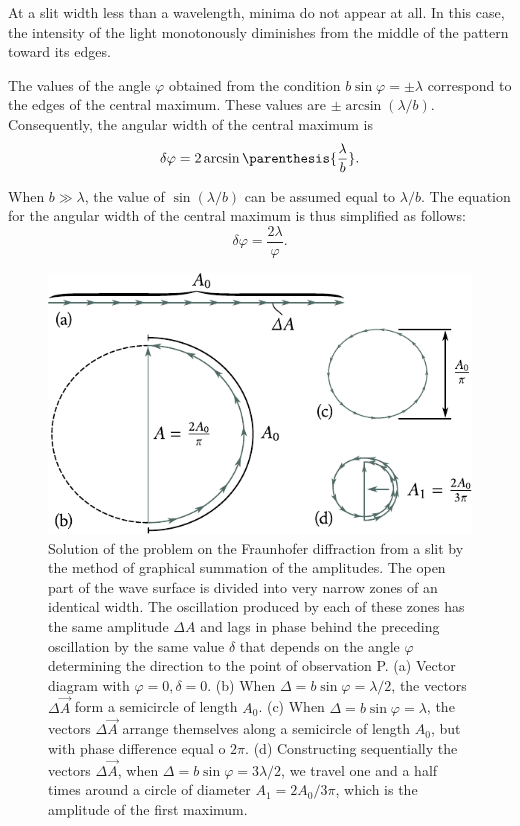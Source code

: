 \noindent
At a slit width less than a wavelength, minima do not appear at all.
In this case, the intensity of the light monotonously diminishes from the middle of the pattern toward its edges.

The values of the angle $\varphi$ obtained from the condition $b\sin\varphi=\pm\lambda$ correspond to the edges of the central maximum.
These values are $\pm\arcsin(\lambda/b)$.
Consequently, the angular width of the central maximum is
\begin{equation}\label{eq:18_28}
	\delta\varphi = 2 \arcsin\parenthesis{\frac{\lambda}{b}}.
\end{equation}

\noindent
When $b\gg\lambda$, the value of $\sin(\lambda/b)$ can be assumed equal to $\lambda/b$.
The equation for the angular width of the central maximum is thus simplified as follows:
\begin{equation}\label{eq:18_29}
	\delta\varphi = \frac{2 \lambda}{\varphi}.
\end{equation}

\begin{figure}[!htb]
	\begin{center}
		\includegraphics[scale=1]{figures/ch_18/fig_18_29.pdf}
        \caption[]{Solution of the problem on the Fraunhofer diffraction from a slit by the method of graphical summation of the amplitudes. The open part of the wave surface is divided into very narrow zones of an identical width. The oscillation produced by each of these zones has the same amplitude $\Delta{A}$ and lags in phase behind the preceding oscillation by the same value $\delta$ that depends on the angle $\varphi$ determining the direction to the point of observation P. (a) Vector diagram with $\varphi=0, \delta=0$. (b) When $\Delta=b\sin\varphi= \lambda/2$, the vectors $\Delta{\vec{A}}$ form a semicircle of length $A_0$. (c) When $\Delta=b\sin\varphi=\lambda$, the vectors $\Delta{\vec{A}}$ arrange themselves along a semicircle of length $A_0$, but with phase difference equal o $2\pi$. (d) Constructing sequentially the vectors $\Delta{\vec{A}}$,  when $\Delta=b\sin\varphi=3\lambda/2$, we travel one and a half times around a circle of diameter $A_1=2A_0/3\pi$, which is the amplitude of the first maximum.}
		\label{fig:18_29}
	\end{center}
	\vspace{-0.8cm}
\end{figure}

